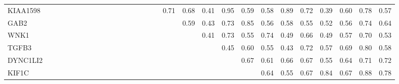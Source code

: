 \begin{longtable}{lrrrrrrrrrrrrrrrrrrrrrrrrrrrr}
KIAA1598 &              &              &            &            &            &            &              &               &            &            &             &             &             &              &             &                &       0.71 &       0.68 &        0.41 &           0.95 &        0.59 &          0.58 &        0.89 &      0.72 &        0.39 &           0.60 &        0.78 &        0.57 \\
GAB2     &              &              &            &            &            &            &              &               &            &            &             &             &             &              &             &                &            &       0.59 &        0.43 &           0.73 &        0.85 &          0.56 &        0.58 &      0.55 &        0.52 &           0.56 &        0.74 &        0.64 \\
WNK1     &              &              &            &            &            &            &              &               &            &            &             &             &             &              &             &                &            &            &        0.41 &           0.73 &        0.55 &          0.74 &        0.49 &      0.66 &        0.49 &           0.57 &        0.70 &        0.53 \\
TGFB3    &              &              &            &            &            &            &              &               &            &            &             &             &             &              &             &                &            &            &             &           0.45 &        0.60 &          0.55 &        0.43 &      0.72 &        0.57 &           0.69 &        0.80 &        0.58 \\
DYNC1LI2 &              &              &            &            &            &            &              &               &            &            &             &             &             &              &             &                &            &            &             &                &        0.67 &          0.61 &        0.66 &      0.67 &        0.55 &           0.64 &        0.71 &        0.72 \\
KIF1C    &              &              &            &            &            &            &              &               &            &            &             &             &             &              &             &                &            &            &             &                &             &          0.64 &        0.55 &      0.67 &        0.84 &           0.67 &        0.88 &        0.78 \\

\end{longtable}
